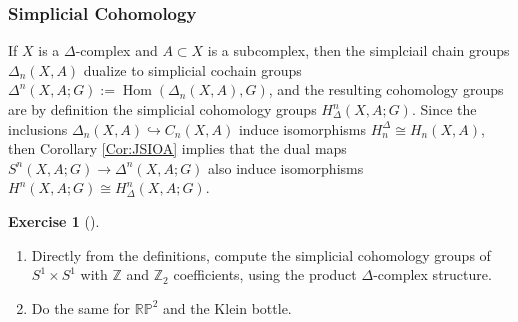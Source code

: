 \documentclass[reqno]{amsart}
\theoremstyle{definition}
\newtheorem{exercise}[theorem]{Exercise}
\theoremstyle{remark}
\DeclareMathOperator{\Hom}{Hom}
\begin{document}
     \subsubsection{Simplicial Cohomology}
     If $X$ is a $\Delta$-complex and
     $A \subset X$ is a subcomplex, then the
     simplciail chain groups $\Delta_n (X,A)$ dualize
     to simplicial cochain groups
     $\Delta^{n}(X,A;G) :=
     \Hom \left( \Delta_n (X,A),G \right) $, and the
     resulting cohomology groups are
     by definition the simplicial cohomology groups
     $H_{\Delta}^{n}(X,A;G)$. Since the inclusions
     $\Delta_n (X,A) \hookrightarrow C_n(X,A)$ induce
     isomorphisms 
     $H_n^{\Delta} \cong H_n (X,A)$, then
     Corollary \ref{Cor:JSIOA} implies that the
     dual maps
     $S^{n}(X,A;G) \to \Delta^{n}(X,A;G)$ also
     induce isomorphisms
     $H^{n}(X,A;G) \cong
     H_{\Delta}^{n}(X,A;G)$.




     \begin{exercise}[]
         \begin{enumerate}
             \item Directly from the definitions, compute
                 the simplicial cohomology
                 groups of $S^{1} \times S^{1}$ with
                 $\mathbb{Z}$ and $\mathbb{Z}_2$ coefficients,
                 using the product $\Delta$-complex structure.
             \item Do the same for $\mathbb{R}\mathbb{P}^2$ and
                 the Klein bottle.
         \end{enumerate}
     \end{exercise}
\end{document}
